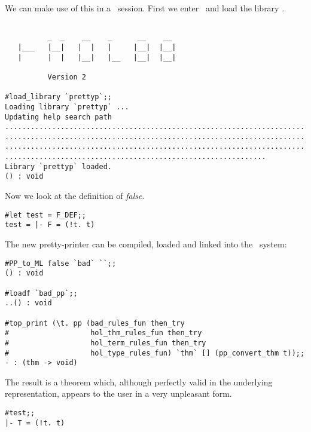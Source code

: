 \noindent
We can make use of this in a \HOL\ session. First we enter \HOL\ and load the
library .

\begin{session}\begin{verbatim}

          _  _    __    _      __    __
   |___   |__|   |  |   |     |__|  |__|
   |      |  |   |__|   |__   |__|  |__|
   
          Version 2

#load_library `prettyp`;;
Loading library `prettyp` ...
Updating help search path
.............................................................................
.............................................................................
.............................................................................
.............................................................
Library `prettyp` loaded.
() : void
\end{verbatim}\end{session}

\noindent
Now we look at the definition of {\it false}.

\begin{session}\begin{verbatim}
#let test = F_DEF;;
test = |- F = (!t. t)
\end{verbatim}\end{session}

\noindent
The new pretty-printer can be compiled, loaded and linked into the \HOL\
system:

\begin{session}\begin{verbatim}
#PP_to_ML false `bad` ``;;
() : void

#loadf `bad_pp`;;
..() : void

#top_print (\t. pp (bad_rules_fun then_try
#                   hol_thm_rules_fun then_try
#                   hol_term_rules_fun then_try
#                   hol_type_rules_fun) `thm` [] (pp_convert_thm t));;
- : (thm -> void)
\end{verbatim}\end{session}

\noindent
The result is a theorem which, although perfectly valid in the underlying
representation, appears to the user in a very unpleasant form.

\begin{session}\begin{verbatim}
#test;;
|- T = (!t. t)
\end{verbatim}\end{session}
